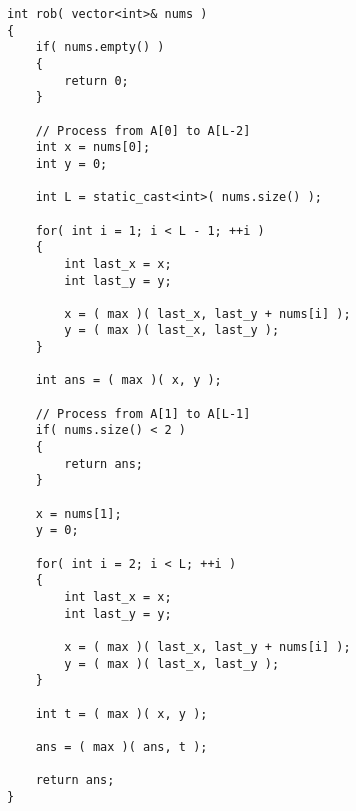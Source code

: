 \begin{lstlisting}[style=customc, caption={Dynamic Programming}]
int rob( vector<int>& nums )
{
    if( nums.empty() )
    {
        return 0;
    }

	// Process from A[0] to A[L-2]
    int x = nums[0];
    int y = 0;

    int L = static_cast<int>( nums.size() );

    for( int i = 1; i < L - 1; ++i )
    {
        int last_x = x;
        int last_y = y;

        x = ( max )( last_x, last_y + nums[i] );
        y = ( max )( last_x, last_y );
    }

    int ans = ( max )( x, y );

	// Process from A[1] to A[L-1]
    if( nums.size() < 2 )
    {
        return ans;
    }

    x = nums[1];
    y = 0;

    for( int i = 2; i < L; ++i )
    {
        int last_x = x;
        int last_y = y;

        x = ( max )( last_x, last_y + nums[i] );
        y = ( max )( last_x, last_y );
    }

    int t = ( max )( x, y );

    ans = ( max )( ans, t );

    return ans;
}
\end{lstlisting}
